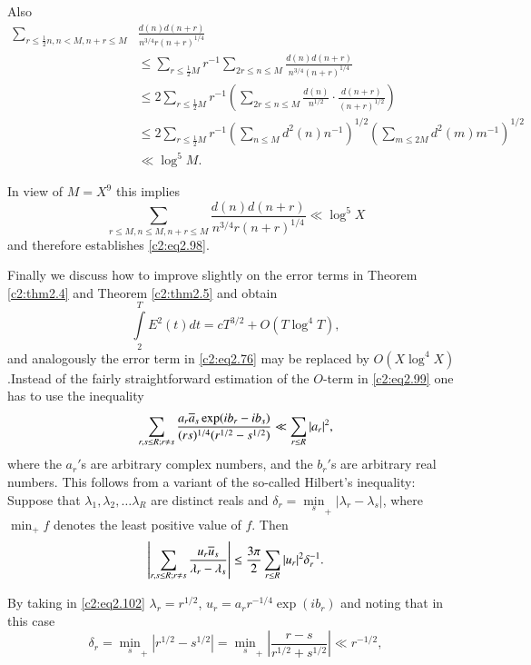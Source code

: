 Also
\begin{align*}
  \sum_{r \leq \frac{1}{2} n, n< M, n+ r\leq M} &\frac{d(n) d(n+r)}{n^{3/4} r
    (n+r)^{1/4}}\\
  &\leq \sum_{r \leq \frac{1}{2} M} r^{-1} \sum_{2r \leq n \leq
    M} \frac{d(n) d (n+r)}{n^{3/4} (n+r)^{1/4}}\\
  &\leq 2 \sum_{r \leq \frac{1}{2} M} r^{-1} \left( \sum_{2r \leq n \leq M}
  \frac{d(n)}{n^{1/2}}\cdot \frac{d(n+r)}{(n+r)^{1/2}} \right)\\
  &\leq 2 \sum_{r \leq \frac{1}{2} M} r^{-1} \left(\sum_{n \leq M} d^2 (n)
  n^{-1}\right)^{1/2} \left(\sum_{m \leq 2M} d^2 (m) m^{-1}
  \right)^{1/2}\\
  & \ll \log^5 M.
\end{align*}

In view of $M= X^9$ this implies
$$
\sum_{r \leq M, n \leq M, n+ r\leq M} \frac{d(n) d(n+r)}{n^{3/4}
  r(n+r)^{1/4}} \ll \log^5 X
$$
and  therefore establishes \eqref{c2:eq2.98}.

Finally we discuss how to improve slightly on the error terms in
Theorem \ref{c2:thm2.4} and Theorem \ref{c2:thm2.5} and obtain
\begin{equation}
  \int\limits_2^T E^2 (t) dt = cT^{3/2} + O(T \log ^4 T),\label{c2:eq2.100}
\end{equation}
and analogously the error term in \eqref{c2:eq2.76} may be replaced by
$O (X \log ^4 X)$.\pageoriginale Instead of the fairly straightforward
estimation of the $O$-term in \eqref{c2:eq2.99} one has to use the inequality
\begin{equation}
  \sum_{r, s\leq R; r \neq s} \frac{a_r \overline{a}_s \exp (ib_r -
    ib_s)}{(rs)^{1/4}(r^{1/2}- s^{1/2})}\ll \sum_{r \leq R}
  |a_r|^2, \label{c2:eq2.101} 
\end{equation}
where the $a_r'$s are arbitrary complex numbers, and the $b_r'$s are
arbitrary real numbers. This follows from a variant of the so-called
Hilbert's inequality: Suppose that $\lambda_1, \lambda_2, \ldots
\lambda_R$ are distinct reals and $\delta_r = \underset{s}{\min}_+
|\lambda_r - \lambda_s|$, where $\min_+ f$ denotes the least positive
value of $f$. Then
\begin{equation}
  \left|\sum_{r, s\leq R; r \neq s} \frac{u_r\overline{u}_s}{\lambda_r -
    \lambda_s}\right| \leq \frac{3 \pi}{2} \sum_{r \leq R}
  |u_r|^{2}\delta_r^{-1}. \label{c2:eq2.102}
\end{equation}

By taking in \eqref{c2:eq2.102} $\lambda_r = r^{1/2}$, $u_r = a_r
r^{-1/4} \exp (ib_r)$ and noting that in this case
$$ 
\delta_r = \underset{s}{\min}_+ |r^{1/2} - s^{1/2}| = \underset{s}{\min}_+
\left|\frac{r-s}{r^{1/2}+ s^{1/2}} \right| \ll r^{-1/2},
 $$

